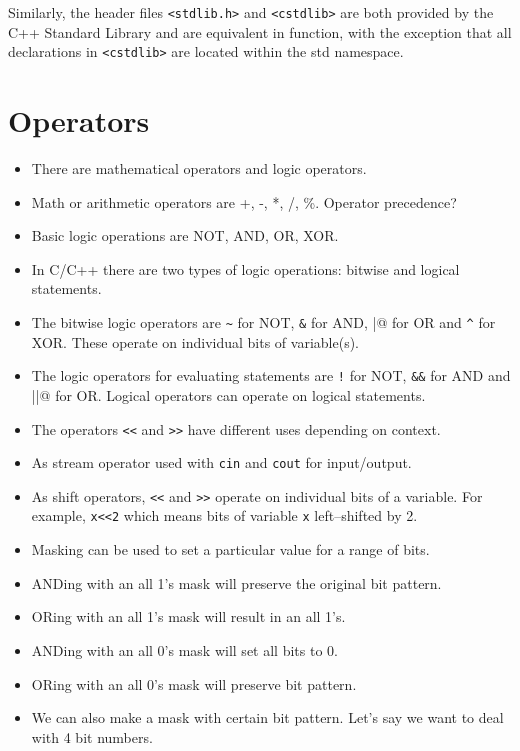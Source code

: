 \documentclass[12pt,a4paper]{article}
\begin{document}
Similarly, the header files \verb|<stdlib.h>| and \verb|<cstdlib>| are both provided by the C++ Standard Library and are equivalent in function, with the exception that all declarations in \verb|<cstdlib>| are located within the std namespace.
\section{Operators}
\begin{itemize}
\item There are mathematical operators and logic operators.
\item Math or arithmetic operators are +, -, *, /, \%. Operator precedence?
\item Basic logic operations are NOT, AND, OR, XOR.
\item In C/C++ there are two types of logic operations: bitwise and logical statements.
\item The bitwise logic operators are \verb|~| for NOT, \verb|&| for AND, \verb@|@ for OR and \verb|^| for XOR. These operate on individual bits of variable(s).
\item The logic operators for evaluating statements are \verb|!| for NOT, \verb|&&| for AND and \verb@||@ for OR. Logical operators can operate on logical statements.
\item The operators \verb|<<| and \verb|>>| have different uses depending on context.
\item As stream operator used with \verb|cin| and \verb|cout| for input/output.
\item As shift operators, \verb|<<| and \verb|>>| operate on individual bits of a variable. For example, \verb|x<<2| which means bits of variable \verb|x| left--shifted by 2.
\end{itemize}
\begin{itemize}
\item Masking can be used to set a particular value for a range of bits.
\item ANDing with an all 1's mask will preserve the original bit pattern.
\item ORing with an all 1's mask will result in an all 1's.
\item ANDing with an all 0's mask will set all bits to 0.
\item ORing with an all 0's mask will preserve bit pattern.
\item We can also make a mask with certain bit pattern. Let's say we want to deal with 4 bit numbers.
\end{itemize}
\end{document}
